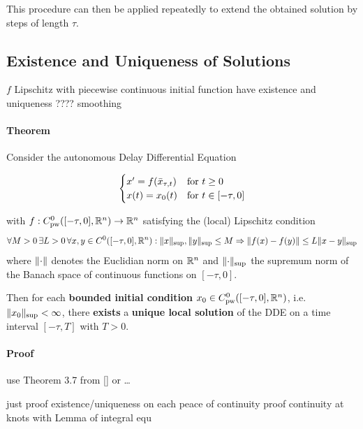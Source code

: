 \documentclass[10pt]{article}
\begin{document}
This procedure can then be applied repeatedly to extend the obtained solution by steps of length $\tau$.

\subsection{Existence and Uniqueness of Solutions} \label{existence-and-uniqueness-of-solutions}

$f$ Lipschitz with piecewise continuous initial function have existence and uniqueness ???? smoothing

\paragraph{Theorem}\label{theorem}
Consider the autonomous Delay Differential Equation



\begin{equation}
    \begin{cases}
        x'=f(\bar{x}_{\tau,t}) & \text{for } t\geq 0\\
        x(t)=x_0(t)     & \text{for } t\in [-\tau,0]
    \end{cases}
\end{equation}

with $f:C^0_\text{pw}([-\tau,0],\mathbb{R}^n)\rightarrow\mathbb{R}^n$ satisfying the (local) Lipschitz condition
\begin{equation}
    \forall M>0\,\exists L>0\,\forall x,y\in C^0([-\tau,0],\mathbb{R}^n) : \lVert x\rVert_{\text{\scriptsize{sup}}},\lVert y\rVert_{\text{\scriptsize{sup}}}\leq M\Rightarrow\lVert f(x)-f(y)\rVert \leq L\lVert x-y\rVert_{\text{\scriptsize{sup}}}
\end{equation}
where $\lVert\cdot\rVert$ denotes the Euclidian norm on $\mathbb{R}^n$ and $\lVert\cdot\rVert_{\text{\scriptsize{sup}}}$ the supremum norm of the Banach space of continuous functions on $[-\tau,0]$.

Then for each \textbf{bounded initial condition} $x_0\in C^0_\text{pw}([-\tau,0],\mathbb{R}^n)$, i.e.\ $\lVert x_0\rVert_{\text{\scriptsize{sup}}}< \infty$, there \textbf{exists} a \textbf{unique local solution} of the DDE on a time interval $[-\tau, T]$ with $T>0$.

\paragraph{Proof}\label{proof-1}
use Theorem 3.7 from {[}{]} or \ldots{}

just proof existence/uniqueness on each peace of continuity proof continuity at knots with Lemma of integral equ
\end{document}
